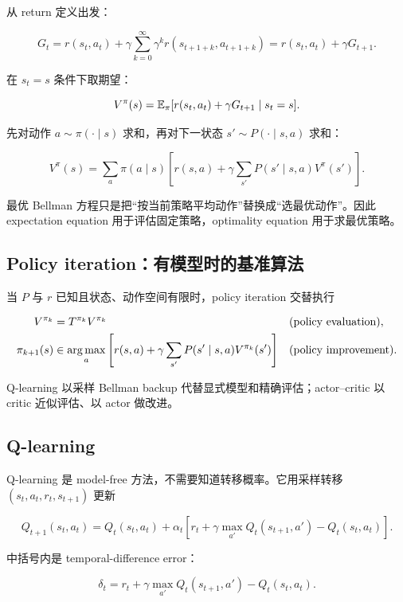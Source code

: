 从 return 定义出发：

\[
  G_t
  =
  r(s_t,a_t)
  +
  \gamma
  \sum_{k=0}^{\infty}\gamma^k r(s_{t+1+k},a_{t+1+k})
  =
  r(s_t,a_t)+\gamma G_{t+1}.
\]

在 \(s_t=s\) 条件下取期望：

\[
  V^\pi(s)
  =
  \mathbb{E}_\pi[r(s_t,a_t)+\gamma G_{t+1}\mid s_t=s].
\]

先对动作 \(a\sim\pi(\cdot\mid s)\) 求和，再对下一状态 \(s'\sim P(\cdot\mid s,a)\) 求和：

\[
  V^\pi(s)
  =
  \sum_a\pi(a\mid s)
  \left[
    r(s,a)
    +
    \gamma\sum_{s'}P(s'\mid s,a)V^\pi(s')
  \right].
\]

最优 Bellman 方程只是把“按当前策略平均动作”替换成“选最优动作”。因此 expectation equation 用于评估固定策略，optimality equation 用于求最优策略。

\subsection{Policy iteration：有模型时的基准算法}

当 \(P\) 与 \(r\) 已知且状态、动作空间有限时，policy iteration 交替执行

\[
  \begin{aligned}
    V^{\pi_k}&=T^{\pi_k}V^{\pi_k}
      &&\text{(policy evaluation)},\\
    \pi_{k+1}(s)&\in\operatorname*{arg\,max}_a
      \left[r(s,a)+\gamma\sum_{s'}P(s'\mid s,a)V^{\pi_k}(s')\right]
      &&\text{(policy improvement)}.
  \end{aligned}
\]

Q-learning 以采样 Bellman backup 代替显式模型和精确评估；actor--critic 以 critic 近似评估、以 actor 做改进。

\subsection{Q-learning}


Q-learning 是 model-free 方法，不需要知道转移概率。它用采样转移 \((s_t,a_t,r_t,s_{t+1})\) 更新

\[
  Q_{t+1}(s_t,a_t)
  =
  Q_t(s_t,a_t)
  +
  \alpha_t
  \left[
    r_t
    +
    \gamma\max_{a'}Q_t(s_{t+1},a')
    -
    Q_t(s_t,a_t)
  \right].
\]

中括号内是 temporal-difference error：

\[
  \delta_t
  =
  r_t
  +
  \gamma\max_{a'}Q_t(s_{t+1},a')
  -
  Q_t(s_t,a_t).
\]

